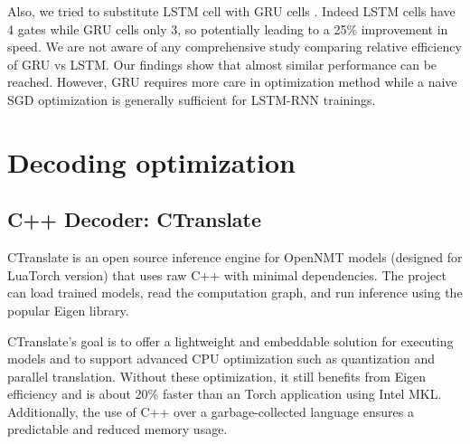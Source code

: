 \documentclass[11pt,a4paper]{article}
\begin{document}
Also, we tried to substitute LSTM \cite{Hochreiter:1997:LSM:1246443.1246450} cell with GRU cells \cite{DBLP:journals/corr/ChoMGBSB14}. Indeed LSTM cells have 4 gates while GRU cells only 3, so potentially leading to a 25\% improvement in speed. We are not aware of any comprehensive study comparing relative efficiency of GRU vs LSTM. Our findings show that almost similar performance can be reached. However, GRU requires more care in optimization method while a naive SGD optimization is generally sufficient for LSTM-RNN trainings.

\section{Decoding optimization}




\subsection{C++ Decoder: CTranslate}

CTranslate is an open source inference engine for OpenNMT models (designed for LuaTorch version) that uses raw C++ with minimal dependencies. The project can load trained models, read the computation graph, and run inference using the popular Eigen library.

CTranslate's goal is to offer a lightweight and embeddable solution for executing models and to support advanced CPU optimization such as quantization and parallel translation. Without these optimization, it still benefits from Eigen efficiency and is about 20\% faster than an Torch application using Intel MKL. Additionally, the use of C++ over a garbage-collected language ensures a predictable and reduced memory usage.
\end{document}
